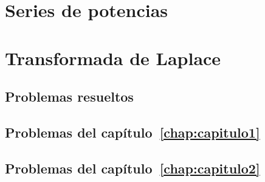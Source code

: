 \documentclass[a4paper, 10pt]{book}
\begin{document}
\chapter{Series de potencias}
\label{chap:capitulo5}


\chapter{Transformada de Laplace}
\label{chap:capitulo6}


\begin{appendices}

\chapter{Problemas resueltos}

\section[Problemas del capítulo 1]{Problemas del capítulo~\ref{chap:capitulo1}}


\section[Problemas del capítulo 2]{Problemas del capítulo~\ref{chap:capitulo2}}


\end{appendices}

\backmatter
\end{document}
